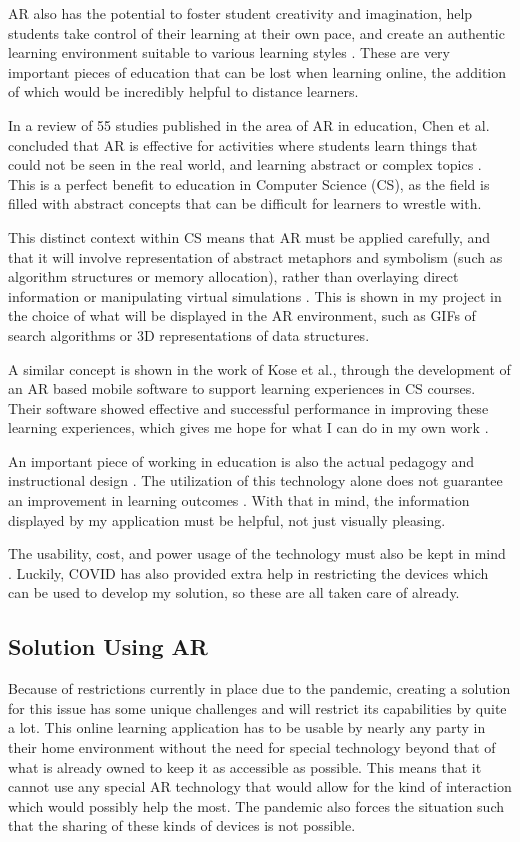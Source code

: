\documentclass[sigconf]{acmart}
\begin{document}
AR also has the potential to foster student creativity and imagination, help students take control of their learning at their own pace, and create an authentic learning environment suitable to various learning styles \cite{yuen11}. These are very important pieces of education that can be lost when learning online, the addition of which would be incredibly helpful to distance learners.

In a review of 55 studies published in the area of AR in education, Chen et al. concluded that AR is effective for activities where students learn things that could not be seen in the real world, and learning abstract or complex topics \cite{chen17}. This is a perfect benefit to education in Computer Science (CS), as the field is filled with abstract concepts that can be difficult for learners to wrestle with.

This distinct context within CS means that AR must be applied carefully, and that it will involve representation of abstract metaphors and symbolism (such as algorithm structures or memory allocation), rather than overlaying direct information or manipulating virtual simulations \cite{resnyansky18}. This is shown in my project in the choice of what will be displayed in the AR environment, such as GIFs of search algorithms or 3D representations of data structures.

A similar concept is shown in the work of Kose et al., through the development of an AR based mobile software to support learning experiences in CS courses. Their software showed effective and successful performance in improving these learning experiences, which gives me hope for what I can do in my own work \cite{kose13}.

An important piece of working in education is also the actual pedagogy and instructional design \cite{kesim12}. The utilization of this technology alone does not guarantee an improvement in learning outcomes \cite{bower14}. With that in mind, the information displayed by my application must be helpful, not just visually pleasing.

The usability, cost, and power usage of the technology must also be kept in mind \cite{antonioli14}. Luckily, COVID has also provided extra help in restricting the devices which can be used to develop my solution, so these are all taken care of already.

\subsection{Solution Using AR}
Because of restrictions currently in place due to the pandemic, creating a solution for this issue has some unique challenges and will restrict its capabilities by quite a lot. This online learning application has to be usable by nearly any party in their home environment without the need for special technology beyond that of what is already owned to keep it as accessible as possible. This means that it cannot use any special AR technology that would allow for the kind of interaction which would possibly help the most. The pandemic also forces the situation such that the sharing of these kinds of devices is not possible.
\end{document}

